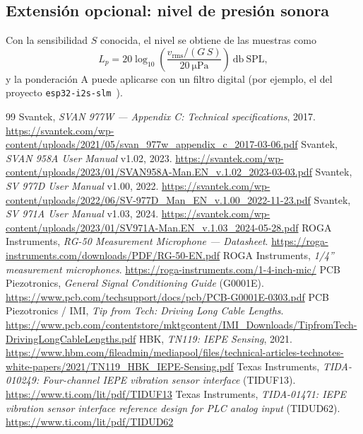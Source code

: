 \documentclass[11pt,a4paper]{article}
\begin{document}
\subsection{Extensión opcional: nivel de presión sonora}
\label{sec:extension}
Con la sensibilidad $S$ conocida, el nivel se obtiene de las muestras como
\begin{equation}
  L_p = 20\log_{10}\!\left(\frac{v_{\text{rms}}/(G\,S)}{\SI{20}{\micro\pascal}}\right)\ \si{\decibel}\ \text{SPL},
\end{equation}
y la ponderación A puede aplicarse con un filtro digital (por ejemplo, el del proyecto \texttt{esp32-i2s-slm}~\cite{slm}).

\begin{thebibliography}{99}
\small
{} Svantek, \emph{SVAN 977W — Appendix C: Technical specifications}, 2017. \url{https://svantek.com/wp-content/uploads/2021/05/svan_977w_appendix_c_2017-03-06.pdf}
 Svantek, \emph{SVAN 958A User Manual} v1.02, 2023. \url{https://svantek.com/wp-content/uploads/2023/01/SVAN958A-Man.EN_v.1.02_2023-03-03.pdf}
 Svantek, \emph{SV 977D User Manual} v1.00, 2022. \url{https://svantek.com/wp-content/uploads/2022/06/SV-977D_Man_EN_v.1.00_2022-11-23.pdf}
 Svantek, \emph{SV 971A User Manual} v1.03, 2024. \url{https://svantek.com/wp-content/uploads/2023/01/SV971A-Man.EN_v.1.03_2024-05-28.pdf}
 ROGA Instruments, \emph{RG-50 Measurement Microphone — Datasheet}. \url{https://roga-instruments.com/downloads/PDF/RG-50-EN.pdf}
 ROGA Instruments, \emph{1/4'' measurement microphones}. \url{https://roga-instruments.com/1-4-inch-mic/}
 PCB Piezotronics, \emph{General Signal Conditioning Guide} (G0001E). \url{https://www.pcb.com/techsupport/docs/pcb/PCB-G0001E-0303.pdf}
 PCB Piezotronics / IMI, \emph{Tip from Tech: Driving Long Cable Lengths}. \url{https://www.pcb.com/contentstore/mktgcontent/IMI_Downloads/TipfromTech-DrivingLongCableLengths.pdf}
 HBK, \emph{TN119: IEPE Sensing}, 2021. \url{https://www.hbm.com/fileadmin/mediapool/files/technical-articles-technotes-white-papers/2021/TN119_HBK_IEPE-Sensing.pdf}
 Texas Instruments, \emph{TIDA-010249: Four-channel IEPE vibration sensor interface} (TIDUF13). \url{https://www.ti.com/lit/pdf/TIDUF13}
 Texas Instruments, \emph{TIDA-01471: IEPE vibration sensor interface reference design for PLC analog input} (TIDUD62). \url{https://www.ti.com/lit/pdf/TIDUD62}

\end{thebibliography}
\end{document}
